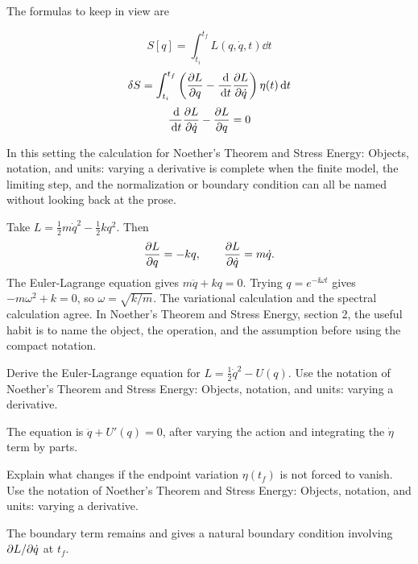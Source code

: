 The formulas to keep in view are

\[
  S[q]=\int_{t_i}^{t_f}L(q,\dot q,t)\dd t
\]
\[
  \delta S=\int_{t_i}^{t_f}\left(\frac{\partial L}{\partial q}-\frac{\,\mathrm d}{\,\mathrm d t}\frac{\partial L}{\partial\dot q}\right)\eta(t)\,\mathrm d t
\]
\[
  \frac{\,\mathrm d}{\,\mathrm d t}\frac{\partial L}{\partial\dot q}-\frac{\partial L}{\partial q}=0
\]

In this setting the calculation for Noether's Theorem and Stress Energy: Objects, notation, and units: varying a derivative is complete when the finite model, the limiting step, and the normalization or boundary condition can all be named without looking back at the prose.




\begin{example}
Take \(L=\frac12m\dot q^2-\frac12kq^2\).  Then
\[
  \frac{\partial L}{\partial q}=-kq,\qquad \frac{\partial L}{\partial\dot q}=m\dot q.
\]
The Euler-Lagrange equation gives \(m\ddot q+kq=0\).  Trying \(q=e^{-\ii\omega t}\) gives \(-m\omega^2+k=0\), so \(\omega=\sqrt{k/m}\).  The variational calculation and the spectral calculation agree.  In Noether's Theorem and Stress Energy, section 2, the useful habit is to name the object, the operation, and the assumption before using the compact notation.
\end{example}



\begin{exercise}
Derive the Euler-Lagrange equation for \(L=\frac12\dot q^2-U(q)\).  Use the notation of Noether's Theorem and Stress Energy: Objects, notation, and units: varying a derivative.
\begin{answer}
The equation is \(\ddot q+U'(q)=0\), after varying the action and integrating the \(\dot\eta\) term by parts.
\end{answer}
\end{exercise}

\begin{exercise}
Explain what changes if the endpoint variation \(\eta(t_f)\) is not forced to vanish.  Use the notation of Noether's Theorem and Stress Energy: Objects, notation, and units: varying a derivative.
\begin{answer}
The boundary term remains and gives a natural boundary condition involving \(\partial L/\partial\dot q\) at \(t_f\).
\end{answer}
\end{exercise}



